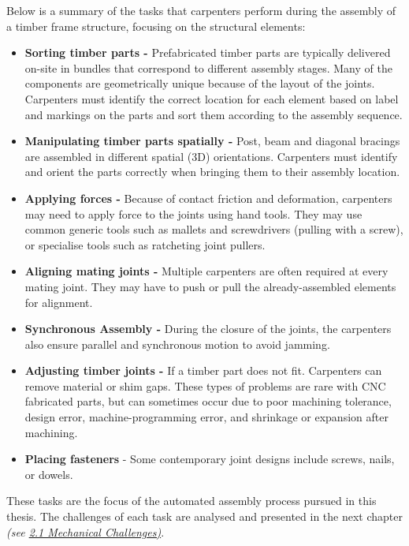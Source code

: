 \documentclass[11pt]{book}
\begin{document}
Below is a summary of the tasks that carpenters perform during the assembly of a timber frame structure, focusing on the structural elements:

\begin{itemize}
	\item \textbf{Sorting timber parts - }Prefabricated timber parts are typically delivered on-site in bundles that correspond to different assembly stages. Many of the components are geometrically unique because of the layout of the joints. Carpenters must identify the correct location for each element based on label and markings on the parts and sort them according to the assembly sequence.

	\item \textbf{Manipulating timber parts spatially - }Post, beam and diagonal bracings are assembled in different spatial (3D) orientations. Carpenters must identify and orient the parts correctly when bringing them to their assembly location.

	\item \textbf{Applying forces - }Because of contact friction and deformation, carpenters may need to apply force to the joints using hand tools. They may use common generic tools such as mallets and screwdrivers (pulling with a screw), or specialise tools such as ratcheting joint pullers. 

	\item \textbf{Aligning mating joints -} Multiple carpenters are often required at every mating joint. They may have to push or pull the already-assembled elements for alignment. 

	\item \textbf{Synchronous Assembly - }During the closure of the joints, the carpenters also ensure parallel and synchronous motion to avoid jamming.

	\item \textbf{Adjusting timber joints - }If a timber part does not fit. Carpenters can remove material or shim gaps. These types of problems are rare with CNC fabricated parts, but can sometimes occur due to poor machining tolerance, design error, machine-programming error, and shrinkage or expansion after machining.

	\item \textbf{Placing fasteners} - Some contemporary joint designs include screws, nails, or dowels.

\end{itemize}
These tasks are the focus of the automated assembly process pursued in this thesis. The challenges of each task are analysed and presented in the next chapter \textit{(see \underline{2.1 Mechanical Challenges)}}.
\end{document}
